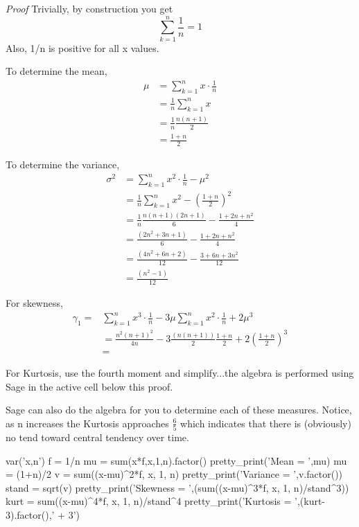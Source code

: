 \documentclass[10pt,]{book}
\makeatletter
\renewcommand*{\proofname}{Proof}
\renewenvironment{proof}[1][\proofname]{\par
  \pushQED{\qed}%
  \normalfont \topsep6\p@\@plus6\p@\relax
  \trivlist
  \item\relax
    {\itshape
    #1\@addpunct{.}}\hspace\labelsep\ignorespaces
}{%
  \popQED\endtrivlist\@endpefalse
}
\numberwithin{equation}{section}
\makeatother
\begin{document}
\begin{proof}\hypertarget{proof-34}{}
\hypertarget{p-775}{}%
Trivially, by construction you get%
\begin{equation*}
\sum_{k=1}^n \frac{1}{n} = 1
\end{equation*}
Also, 1/n is positive for all x values.%
\par
\hypertarget{p-776}{}%
To determine the mean,%
\begin{align*}
\mu & = \sum_{k=1}^n x \cdot \frac{1}{n}\\
& = \frac{1}{n}\sum_{k=1}^n x \\
& = \frac{1}{n} \frac{n(n+1)}{2}\\
& = \frac{1+n}{2}
\end{align*}
%
\par
\hypertarget{p-777}{}%
To determine the variance,%
\begin{align*}
\sigma^2 & = \sum_{k=1}^n x^2 \cdot \frac{1}{n} - \mu^2\\
& = \frac{1}{n}\sum_{k=1}^n x^2 - \left ( \frac{1+n}{2}\right )^2 \\
& = \frac{1}{n} \frac{n(n+1)(2n+1)}{6} - \frac{1+2n+n^2}{4}\\
& = \frac{(2n^2+3n+1)}{6} - \frac{1+2n+n^2}{4}\\
& = \frac{(4n^2+6n+2)}{12} - \frac{3+6n+3n^2}{12}\\
& = \frac{(n^2-1)}{12}
\end{align*}
%
\par
\hypertarget{p-778}{}%
For skewness,%
\begin{align*}
\gamma_1 = & \sum_{k=1}^n x^3 \cdot \frac{1}{n} - 3 \mu \sum_{k=1}^n x^2 \cdot \frac{1}{n}  + 2\mu^3\\
& = \frac{n^2(n+1)^2}{4n} - 3\frac{(n(n+1))}{2} \frac{1+n}{2} + 2 \left ( \frac{1+n}{2}\right )^3 \\
& = 
\end{align*}
%
\par
\hypertarget{p-779}{}%
For Kurtosis, use the fourth moment and simplify...the algebra is performed using Sage in the active cell below this proof.%
\end{proof}
%
\par
\hypertarget{p-780}{}%
Sage can also do the algebra for you to determine each of these measures. Notice, as n increases the Kurtosis approaches \(\frac{6}{5}\) which indicates that there is (obviously) no tend toward central tendency over time.%
\par
\hypertarget{p-781}{}%
\leavevmode%
\begin{sageinput}
var('x,n')
f = 1/n
mu = sum(x*f,x,1,n).factor()
pretty_print('Mean = ',mu)
mu = (1+n)/2
v = sum((x-mu)^2*f, x, 1, n)
pretty_print('Variance = ',v.factor())
stand = sqrt(v)
pretty_print('Skewness =  ',(sum((x-mu)^3*f, x, 1, n)/stand^3))
kurt = sum((x-mu)^4*f, x, 1, n)/stand^4
pretty_print('Kurtosis = ',(kurt-3).factor(),' + 3')
\end{sageinput}
\end{document}
